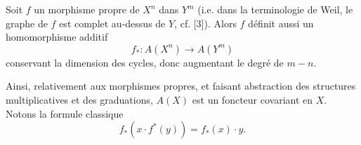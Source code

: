 \documentclass[11pt]{article}
\begin{document}
Soit $f$ un morphisme propre de $X^n$ dans $Y^m$ (i.e. dans la terminologie de Weil, le graphe de $f$ est complet au-dessus de $Y$, cf. [3]). Alors $f$ définit aussi un homomorphisme additif
\begin{equation}\tag{2.2}
f_*:A(X^n)\longrightarrow A(Y^m)
\end{equation}
conservant la dimension des cycles, donc augmentant le degré de $m-n$.




Ainsi, relativement aux morphismes propres, et faisant abstraction des structures multiplicatives et des graduations, $A(X)$ est un foncteur covariant en $X$. Notons la formule classique
\begin{equation}\tag{2.3}
 f_*(x\cdot f^*(y))=f_*(x)\cdot y .
\end{equation}
\end{document}

